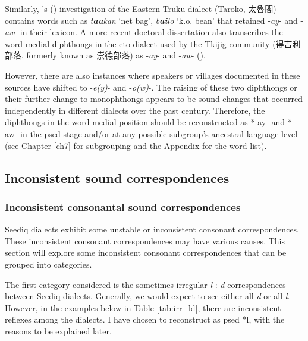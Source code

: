 Similarly, \citeauthor{tashiro1900easterntw}'s (\citeyear{tashiro1900easterntw}) investigation of the Eastern Truku dialect (Taroko, 太魯閣) contains words such as \textit{t\textbf{au}kan} `net bag', \textit{b\textbf{ai}lo} `k.o. bean' that retained -\textit{ay}- and -\textit{aw}- in their lexicon. A more recent doctoral dissertation also transcribes the word-medial diphthongs in the \acl{eto} dialect used by the Tkijig community (得吉利部落, formerly known as 崇德部落) as -\textit{ay}- and -\textit{aw}- (\cite{tsukida2009}).

However, there are also instances where speakers or villages documented in these sources have shifted to -\textit{e(y)}- and -\textit{o(w)}-. The raising of these two diphthongs or their further change to monophthongs appears to be sound changes that occurred independently in different dialects over the past century. Therefore, the diphthongs in the word-medial position should be reconstructed as *-ay- and *-aw- in the \acl{psed} stage and/or at any possible subgroup's ancestral language level (see Chapter \ref{ch7} for subgrouping and the Appendix for the word list).

\subsection{Inconsistent sound correspondences}

\subsubsection{Inconsistent consonantal sound correspondences}

Seediq dialects exhibit some unstable or inconsistent consonant correspondences. These inconsistent consonant correspondences may have various causes. This section will explore some inconsistent consonant correspondences that can be grouped into categories.

The first category considered is the sometimes irregular \textit{l} : \textit{d} correspondences between Seediq dialects. Generally, we would expect to see either all \textit{d} or all \textit{l}. However, in the examples below in Table \ref{tab:irr_ld}, there are inconsistent reflexes among the dialects. I have chosen to reconstruct as \acl{psed} *l, with the reasons to be explained later.

